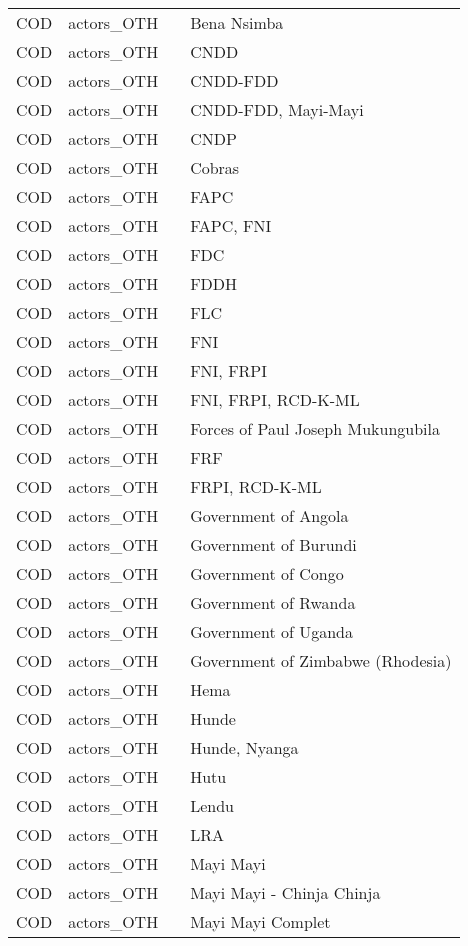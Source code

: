 \begin{table}[ht]
\begin{tabular}{llll}
  COD & actors\_OTH &  & Bena Nsimba \\ 
  COD & actors\_OTH &  & CNDD \\ 
  COD & actors\_OTH &  & CNDD-FDD \\ 
  COD & actors\_OTH &  & CNDD-FDD, Mayi-Mayi \\ 
  COD & actors\_OTH &  & CNDP \\ 
  COD & actors\_OTH &  & Cobras \\ 
  COD & actors\_OTH &  & FAPC \\ 
  COD & actors\_OTH &  & FAPC, FNI \\ 
  COD & actors\_OTH &  & FDC \\ 
  COD & actors\_OTH &  & FDDH \\ 
  COD & actors\_OTH &  & FLC \\ 
  COD & actors\_OTH &  & FNI \\ 
  COD & actors\_OTH &  & FNI, FRPI \\ 
  COD & actors\_OTH &  & FNI, FRPI, RCD-K-ML \\ 
  COD & actors\_OTH &  & Forces of Paul Joseph Mukungubila \\ 
  COD & actors\_OTH &  & FRF \\ 
  COD & actors\_OTH &  & FRPI, RCD-K-ML \\ 
  COD & actors\_OTH &  & Government of Angola \\ 
  COD & actors\_OTH &  & Government of Burundi \\ 
  COD & actors\_OTH &  & Government of Congo \\ 
  COD & actors\_OTH &  & Government of Rwanda \\ 
  COD & actors\_OTH &  & Government of Uganda \\ 
  COD & actors\_OTH &  & Government of Zimbabwe (Rhodesia) \\ 
  COD & actors\_OTH &  & Hema \\ 
  COD & actors\_OTH &  & Hunde \\ 
  COD & actors\_OTH &  & Hunde, Nyanga \\ 
  COD & actors\_OTH &  & Hutu \\ 
  COD & actors\_OTH &  & Lendu \\ 
  COD & actors\_OTH &  & LRA \\ 
  COD & actors\_OTH &  & Mayi Mayi \\ 
  COD & actors\_OTH &  & Mayi Mayi - Chinja Chinja \\ 
  COD & actors\_OTH &  & Mayi Mayi Complet \\ 

\end{tabular}
\end{table}
